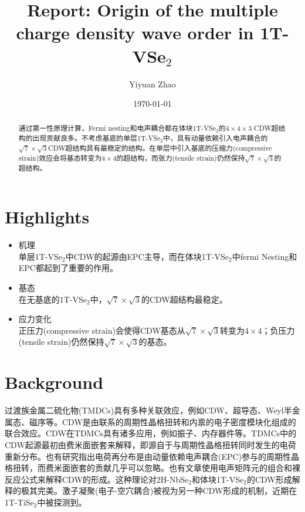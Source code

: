 \documentclass[reprint, aps, prb, showkeys]{revtex4-2}
\begin{document}
\title{Report: Origin of the multiple charge density wave order in 1T-VSe$_2$}

\author{Yiyuan Zhao}
\date{\today}

\begin{abstract}
通过第一性原理计算，Fermi nesting和电声耦合都在体块1T-VSe$_2$的$4 \times 4 \times 3$ CDW超结构的出现贡献良多。不考虑基底的单层1T-VSe$_2$中，具有动量依赖引入电声耦合的$\sqrt{7} \times \sqrt{3}$CDW超结构具有最稳定的结构。在单层中引入基底的压缩力(compressive strain)效应会将基态转变为$4 \times 4$的超结构，而张力(tensile strain)仍然保持$\sqrt{7} \times \sqrt{3}$的超结构。
\end{abstract}


\maketitle
\section{Highlights}
\begin{itemize}
    \item 机理 \\
    单层1T-VSe$_2$中CDW的起源由EPC主导，而在体块1T-VSe$_2$中fermi Nesting和EPC都起到了重要的作用。
    \item 基态 \\
    在无基底的1T-VSe$_2$中，$\sqrt{7} \times \sqrt{3}$的CDW超结构最稳定。
    \item 应力变化 \\
    正压力(compressive strain)会使得CDW基态从$\sqrt{7} \times \sqrt{3}$转变为$4 \times 4$；负压力(tensile strain)仍然保持$\sqrt{7} \times \sqrt{3}$的基态。
\end{itemize}


\section{Background}
过渡族金属二硫化物(TMDCs)具有多种关联效应，例如CDW、超导态、Weyl半金属态、磁序等。CDW是由联系的周期性晶格扭转和内禀的电子密度模块化组成的联合效应。CDW在TDMCs具有诸多应用，例如振子、内存器件等。TDMCs中的CDW起源最初由费米面嵌套来解释，即源自于与周期性晶格扭转同时发生的电荷重新分布。也有研究指出电荷再分布是由动量依赖电声耦合(EPC)参与的周期性晶格扭转，而费米面嵌套的贡献几乎可以忽略。也有文章使用电声矩阵元的组合和裸反应公式来解释CDW的形成。这种理论对2H-NbSe$_2$和体块1T-VSe$_2$的CDW形成解释的极其完美。激子凝聚(电子-空穴耦合)被视为另一种CDW形成的机制，近期在1T-TiSe$_2$中被探测到。
\end{document}
